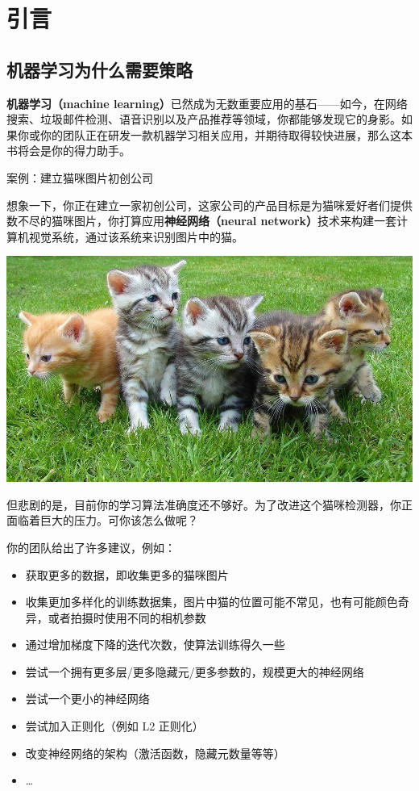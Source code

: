 \hypertarget{ux5f15ux8a00}{%
\part{引言}\label{ux5f15ux8a00}}

\hypertarget{ux673aux5668ux5b66ux4e60ux4e3aux4ec0ux4e48ux9700ux8981ux7b56ux7565}{%
\chapter{机器学习为什么需要策略}\label{ux673aux5668ux5b66ux4e60ux4e3aux4ec0ux4e48ux9700ux8981ux7b56ux7565}}

\textbf{机器学习（machine
learning）}已然成为无数重要应用的基石------如今，在网络搜索、垃圾邮件检测、语音识别以及产品推荐等领域，你都能够发现它的身影。如果你或你的团队正在研发一款机器学习相关应用，并期待取得较快进展，那么这本书将会是你的得力助手。

案例：建立猫咪图片初创公司

想象一下，你正在建立一家初创公司，这家公司的产品目标是为猫咪爱好者们提供数不尽的猫咪图片，你打算应用\textbf{神经网络（neural
network）}技术来构建一套计算机视觉系统，通过该系统来识别图片中的猫。

\includegraphics{./img/ch01_cats.jpg}

但悲剧的是，目前你的学习算法准确度还不够好。为了改进这个猫咪检测器，你正面临着巨大的压力。可你该怎么做呢？

你的团队给出了许多建议，例如：

\begin{itemize}
\tightlist
\item
  获取更多的数据，即收集更多的猫咪图片
\item
  收集更加多样化的训练数据集，图片中猫的位置可能不常见，也有可能颜色奇异，或者拍摄时使用不同的相机参数
\item
  通过增加梯度下降的迭代次数，使算法训练得久一些
\item
  尝试一个拥有更多层/更多隐藏元/更多参数的，规模更大的神经网络
\item
  尝试一个更小的神经网络
\item
  尝试加入正则化（例如 L2 正则化）
\item
  改变神经网络的架构（激活函数，隐藏元数量等等）
\item
  \ldots{}
\end{itemize}

